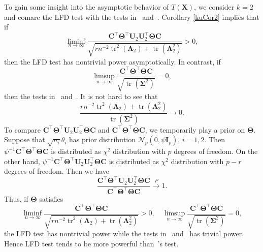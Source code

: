 \documentclass[12pt]{article} %
\DeclareMathOperator{\mytr}{tr}
\newcommand{\bX}{\mathbf{X}}
\newcommand{\bC}{\mathbf{C}}
\newcommand{\bI}{\mathbf{I}}
\newcommand{\bU}{\mathbf{U}}
\newcommand{\bfsym}[1]{\ensuremath{\boldsymbol{#1}}}
\def\bLambda {\bfsym {\Lambda}}
\def\bSigma {\bfsym {\Sigma}}
\def\bTheta {\bfsym {\Theta}}
\theoremstyle{definition}
\begin{document}
To gain some insight into the asymptotic behavior of $T(\bX)$, we consider $k=2$ and comare the LFD test with the tests in~\cite{Bai1996Efiect} and~\cite{Chen2010A}.
Corollary \ref{kuCor2} implies that if
\begin{equation*}
    \liminf_{n\to \infty}\frac{
    \bC^\top \bTheta^\top \bU_2 \bU_2^\top \bTheta \bC
}{
    \sqrt{
        rn^{-2} \mytr^2 (\bLambda_2) + \mytr(\bLambda_2^2)
    }
}
>0,
\end{equation*}
then the LFD test has nontrivial power asymptotically.
In contrast, if
\begin{equation*}
    \limsup_{n\to \infty}\frac{
    \bC^\top \bTheta^\top \bTheta \bC
}{
    \sqrt{
        \mytr(\bSigma^2)
    }
}
=0,
\end{equation*}
then the tests in~\cite{Bai1996Efiect} and~\cite{Chen2010A}.
It is not hard to see that
\begin{equation*}
    \frac{rn^{-2} \mytr^2 (\bLambda_2) + \mytr(\bLambda_2^2)}{
        \mytr(\bSigma^2)
    }\to 0.
\end{equation*}
To compare 
$
    \bC^\top \bTheta^\top \bU_2 \bU_2^\top \bTheta \bC
$
and
$
    \bC^\top \bTheta^\top \bTheta \bC
$,
we temporarily play a prior on $\bTheta$.
Suppose that $\sqrt{n_i} \theta_i$ has prior distribution $\mathcal{N}_p(0,\psi \bI_p)$, $i=1,2$.
Then
$
\psi^{-1}\bC^\top \bTheta^\top \bTheta \bC$
is distributed as $\chi^2$ distribution with $p$ degrees of freedom.
On the other hand,
$\psi^{-1}\bC^\top \bTheta^\top \bU_2 \bU_2^\top \bTheta \bC$  is distributed as 
$\chi^2$ distribution with $p-r$ degrees of freedom.
Then we have
$$
\frac{\bC^\top \bTheta^\top \bU_2 \bU_2^\top \bTheta \bC}{\bC^\top \bTheta^\top \bTheta \bC}\xrightarrow{P}1.
$$
Thus, if $\bTheta$ satisfies
\begin{equation*}
    \liminf_{n\to \infty}\frac{
    \bC^\top \bTheta^\top \bTheta \bC
}{
    \sqrt{
        rn^{-2} \mytr^2 (\bLambda_2) + \mytr(\bLambda_2^2)
    }
}
>0,
\quad
    \limsup_{n\to \infty}\frac{
    \bC^\top \bTheta^\top \bTheta \bC
}{
    \sqrt{
        \mytr(\bSigma^2)
    }
}
=0,
\end{equation*}
the LFD test has nontrivial power while  the tests in~\cite{Bai1996Efiect} and~\cite{Chen2010A} has trivial power.
Hence LFD test tends to be more powerful than~\cite{Chen2010A}'s test.
\end{document}
